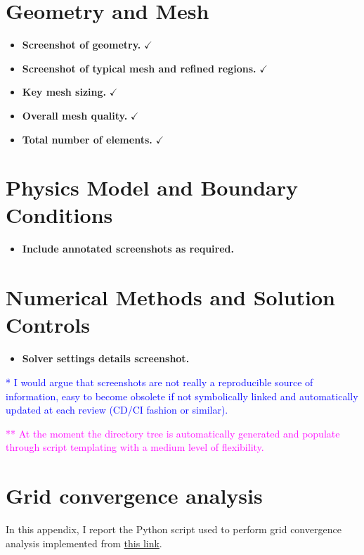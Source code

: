 \documentclass[12pt]{article}
\begin{document}
\section*{Geometry and Mesh}
\begin{itemize}
    \item \textbf{Screenshot of geometry.} $\checkmark$
    \item \textbf{Screenshot of typical mesh and refined regions.} $\checkmark$
    \item \textbf{Key mesh sizing.} $\checkmark$
    \item \textbf{Overall mesh quality.} $\checkmark$
    \item \textbf{Total number of elements.} $\checkmark$
\end{itemize}

\section*{Physics Model and Boundary Conditions}
\begin{itemize}
    \item \textbf{Include annotated screenshots as required.}
\end{itemize}

\section*{Numerical Methods and Solution Controls}
\begin{itemize}
    \item \textbf{Solver settings details screenshot.} 
\end{itemize}

\noindent \textcolor{blue}{* I would argue that screenshots are not really a reproducible source of information, easy to become obsolete if not symbolically linked and automatically updated at each review (CD/CI fashion or similar).}

\vspace{0.5cm}

\noindent \textcolor{magenta}{** At the moment the directory tree is automatically generated and populate through script templating with a medium level of flexibility.}

\newpage

\section*{Grid convergence analysis}
In this appendix, I report the Python script used to perform grid convergence analysis implemented from \href{https://cfd.university/blog/how-to-manage-uncertainty-in-cfd-the-grid-convergence-index}{this link}.
\end{document}
